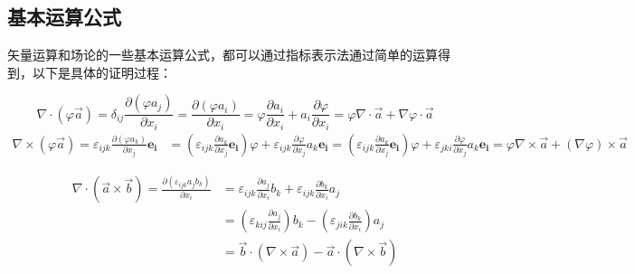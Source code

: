 \documentclass{ctexart}
\begin{document}
\subsection{基本运算公式}

矢量运算和场论的一些基本运算公式，都可以通过指标表示法通过简单的运算得到，以下是具体的证明过程：
\par
{}
$$
\nabla \cdot(\varphi \vec{a})= 
\delta_{i j}\frac{\partial\left(\varphi a_{j}\right)}{\partial x_{i}}=
\frac{\partial\left(\varphi a_{i}\right)}{\partial x_{i}} =
\varphi \frac{\partial a_{i}}{\partial x_{i}}+a_{i} \frac{\partial\varphi}{\partial x_{i}} =
\varphi \nabla \cdot \vec{a}+\nabla \varphi \cdot \vec{a}
$$
$$
\begin{aligned}
\nabla \times (\varphi \vec{a})=\varepsilon_{i j k} \frac{\partial\left(\varphi a_{k}\right)}{\partial x_{j}} \boldsymbol{e_{i}} &=\left(\varepsilon_{i j k} \frac{\partial a_{k}}{\partial x_{j}} \boldsymbol{e_{i}}\right) \varphi+\varepsilon_{i j k} \frac{\partial \varphi}{\partial x_{j}} a_{k} \boldsymbol{e_{i}} =
\left(\varepsilon_{i j k} \frac{\partial a_{k}}{\partial x_{j}} \boldsymbol{e_{i}}\right) \varphi+\varepsilon_{j k i} \frac{\partial \varphi}{\partial x_{j}} a_{k} \boldsymbol{e_{i}}
=\varphi \nabla \times \vec{a}+(\nabla \varphi) \times \vec{a}
\end{aligned}
$$

$$
\begin{aligned}
\nabla \cdot(\vec{a} \times \vec{b}) 
=\frac{\partial\left(\varepsilon_{i j k} a_{j} b_{k}\right)}{\partial x_{i}}
&=\varepsilon_{i j k} \frac{\partial a_{j}}{\partial x_{i}} b_{k}+\varepsilon_{i j k} \frac{\partial b_{k}}{\partial x_{i}} a_{j} 
\\
&=\left(\varepsilon_{k i j} \frac{\partial a_{j}}{\partial x_{i}} \right)b_{k} -\left(\varepsilon_{j i k} \frac{\partial b_{k}}{\partial x_{i}} \right) a_{j} 
\\
&=\vec{b} \cdot(\nabla \times \vec{a})-\vec{a} \cdot (\nabla \times \vec{b})
\end{aligned}
$$
\end{document}

